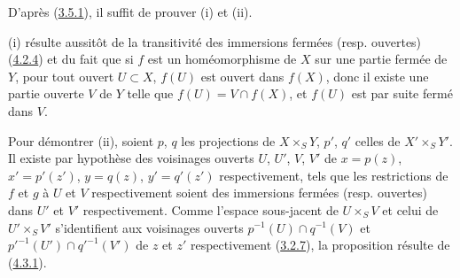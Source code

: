 D'après (\hyperref[I.3.5.1-fr]{3.5.1}), il suffit de prouver (i) et (ii).

(i) résulte aussitôt de la transitivité des immersions fermées (resp.
ouvertes) (\hyperref[I.4.2.4-fr]{4.2.4}) et du fait que si $f$ est un
homéomorphisme de $X$ sur une partie fermée de $Y$, pour tout ouvert
$U\subset X$, $f(U)$ est ouvert dans $f(X)$, donc il existe une partie
ouverte $V$ de $Y$ telle que $f(U)=V\cap f(X)$, et $f(U)$ est par suite fermé
dans $V$.

Pour démontrer (ii), soient $p$, $q$ les projections de $X\times_S Y$, $p'$,
$q'$ celles de $X'\times_S Y'$. Il existe par hypothèse des voisinages
ouverts $U$, $U'$, $V$, $V'$ de $x=p(z)$, $x'=p'(z')$, $y=q(z)$,
$y'=q'(z')$ respectivement, tels que les restrictions de $f$ et $g$ à $U$
et $V$ respectivement soient des immersions fermées (resp. ouvertes) dans
$U'$ et $V'$ respectivement. Comme l'espace sous-jacent de $U\times_S V$ et
celui de $U'\times_S V'$ s'identifient aux voisinages ouverts
$p^{-1}(U)\cap q^{-1}(V)$ et ${p'}^{-1}(U')\cap{q'}^{-1}(V')$ de $z$ et
$z'$ respectivement (\hyperref[I.3.2.7-fr]{3.2.7}), la proposition résulte
de (\hyperref[I.4.3.1-fr]{4.3.1}).
